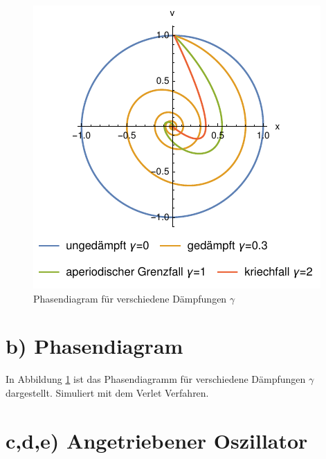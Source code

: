 \begin{figure}
	\centering
	\includegraphics[width=\linewidth]{B_Phase.pdf}
	\caption{Phasendiagram für verschiedene Dämpfungen $\gamma$}
	\label{fig:phase}
\end{figure}

\section*{b) Phasendiagram}
In Abbildung \ref{fig:phase} ist das Phasendiagramm für verschiedene Dämpfungen $\gamma$ dargestellt. Simuliert mit dem Verlet Verfahren.


\section*{c,d,e) Angetriebener Oszillator}
\begin{figure}
	\begin{subarray}{}
		
	\end{subarray}
\end{figure}

